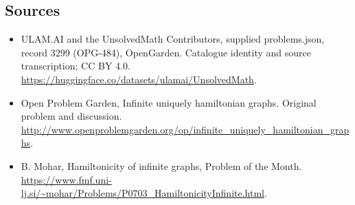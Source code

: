 \documentclass[11pt,a4paper]{article}
\begin{document}
\subsection{Sources}
\begin{itemize}
\item[S1] ULAM.AI and the UnsolvedMath Contributors, supplied problems.json, record 3299 (OPG-484), OpenGarden. Catalogue identity and source transcription; CC BY 4.0.
\url{https://huggingface.co/datasets/ulamai/UnsolvedMath}.
\item[S2] Open Problem Garden, Infinite uniquely hamiltonian graphs. Original problem and discussion.
\url{http://www.openproblemgarden.org/op/infinite_uniquely_hamiltonian_graphs}.
\item[S3] B. Mohar, Hamiltonicity of infinite graphs, Problem of the Month.
\url{https://www.fmf.uni-lj.si/~mohar/Problems/P0703_HamiltonicityInfinite.html}.
\end{itemize}
\end{document}
